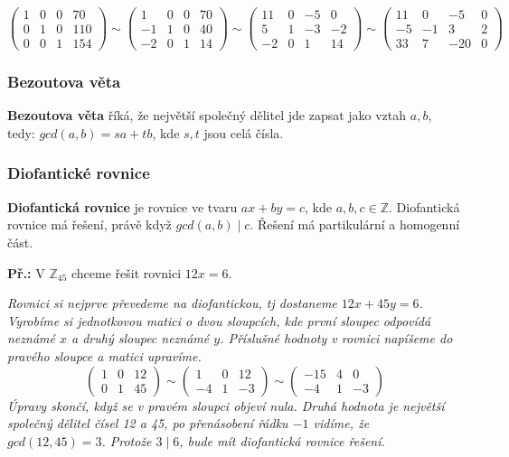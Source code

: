 \documentclass[10pt,a4paper]{article}
\begin{document}
\[ \left( \begin{array}{ccc|c}
1 & 0 & 0 & 70\\
0 & 1 & 0 &  110\\
0 & 0 & 1 &  154
\end{array} \right)
%
\sim
%
\left( \begin{array}{ccc|c}
1 & 0 & 0 & 70\\
-1 & 1 & 0 &  40\\
-2 & 0 & 1 &  14
\end{array} \right)
%
\sim
%
\left( \begin{array}{ccc|c}
11 & 0 & -5 & 0\\
5 & 1 & -3 &  -2\\
-2 & 0 & 1 &  14
\end{array} \right)
%
\sim
%
\left( \begin{array}{ccc|c}
11 & 0 & -5 & 0\\
-5 & -1 & 3 &  2\\
33 & 7 & -20 &  0
\end{array} \right)
\]

\subsubsection{Bezoutova věta}
\textbf{Bezoutova věta} říká, že největší společný dělitel jde zapsat jako vztah $a,b$, tedy: $gcd(a, b) = sa + tb$, kde $s,t$ jsou celá čísla.

\subsubsection{Diofantické rovnice}
\textbf{Diofantická rovnice} je rovnice ve tvaru $ax + by = c$, kde $a,b,c \in \mathbb{Z}$. Diofantická rovnice má řešení, právě když $gcd(a,b) \mid c$. Řešení má partikulární a homogenní část.

\textbf{Př.:} V $\mathbb{Z}_{45}$ chceme řešit rovnici $12x = 6$.

\textit{Rovnici si nejprve převedeme na diofantickou, tj dostaneme $12x + 45y = 6$. Vyrobíme si jednotkovou matici o dvou sloupcích, kde první sloupec odpovídá neznámé $x$ a druhý sloupec neznámé $y$. Příslušné hodnoty v rovnici napíšeme do pravého sloupce a matici upravíme.}
\[ \left( \begin{array}{cc|c}
1 & 0 & 12\\
0 & 1 & 45
\end{array} \right)
%
\sim
%
\left( \begin{array}{cc|c}
1 & 0 & 12\\
-4 & 1 & -3
\end{array} \right)
%
\sim
%
\left( \begin{array}{cc|c}
-15 & 4 & 0\\
-4 & 1 & -3
\end{array} \right)
\]
\textit{Úpravy skončí, když se v pravém sloupci objeví nula. Druhá hodnota je největší společný dělitel čísel 12 a 45, po přenásobení řádku $-1$ vidíme, že $gcd(12,45)=3$. Protože $3 \mid 6$, bude mít diofantická rovnice řešení.}
\end{document}
